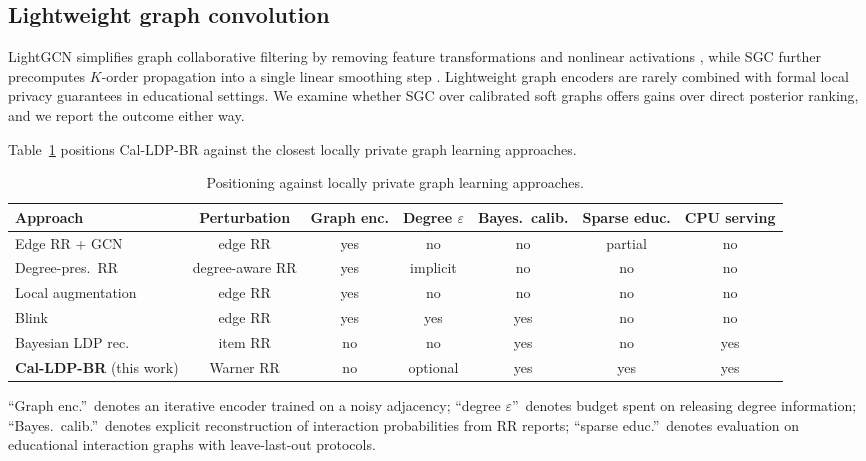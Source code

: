 \documentclass[pdflatex,sn-basic,Numbered]{sn-jnl}
\theoremstyle{plain}
\theoremstyle{remark}
\theoremstyle{definition}
\newcommand{\eps}{\varepsilon}
\begin{document}
\subsection{Lightweight graph convolution}

LightGCN simplifies graph collaborative filtering by removing feature transformations and nonlinear activations \cite{he2020lightgcn}, while SGC further precomputes $K$-order propagation into a single linear smoothing step \cite{wu2019sgc}. Lightweight graph encoders are rarely combined with formal local privacy guarantees in educational settings. We examine whether SGC over calibrated soft graphs offers gains over direct posterior ranking, and we report the outcome either way.

Table~\ref{tab:related} positions Cal-LDP-BR against the closest locally private graph learning approaches.

\begin{table}[t]
\caption{Positioning against locally private graph learning approaches.}
\label{tab:related}
\footnotesize
\setlength{\tabcolsep}{1.5pt}
\begin{tabular}{@{}lcccccc@{}}
\toprule
Approach & Perturbation & Graph enc. & Degree $\eps$ & Bayes.\ calib. & Sparse educ. & CPU serving \\
\midrule
Edge RR + GCN \cite{sajadmanesh2021lpgnn} & edge RR & yes & no & no & partial & no \\
Degree-pres.\ RR \cite{hidano2024degree} & degree-aware RR & yes & implicit & no & no & no \\
Local augmentation \cite{pei2024privacy} & edge RR & yes & no & no & no & no \\
Blink \cite{zhu2023blink} & edge RR & yes & yes & yes & no & no \\
Bayesian LDP rec.\ \cite{tang2025bayesian} & item RR & no & no & yes & no & yes \\
\textbf{Cal-LDP-BR} (this work) & Warner RR & no & optional & yes & yes & yes \\
\bottomrule
\end{tabular}

\vspace{2pt}
{\footnotesize ``Graph enc.''\ denotes an iterative encoder trained on a noisy adjacency; ``degree $\eps$''\ denotes budget spent on releasing degree information; ``Bayes.\ calib.''\ denotes explicit reconstruction of interaction probabilities from RR reports; ``sparse educ.''\ denotes evaluation on educational interaction graphs with leave-last-out protocols.}
\end{table}
\end{document}
